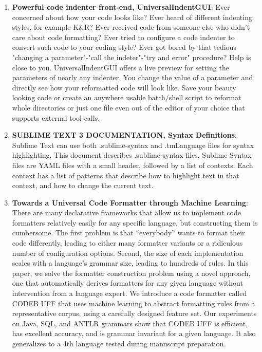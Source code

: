 \begin{englishtext}
\begin{enumerate}
    \item \textbf{Powerful code indenter front-end, UniversalIndentGUI}: Ever concerned
    about how your code looks like? Ever heard of different indenting styles,
    for example K\&R? Ever received code from someone else who didn't care about
    code formatting? Ever tried to configure a code indenter to convert such
    code to your coding style? Ever got bored by that tedious "changing a
    parameter"-"call the indeter"-"try and error" procedure? Help is close to
    you. UniversalIndentGUI offers a live preview for setting the parameters of
    nearly any indenter. You change the value of a parameter and directly see
    how your reformatted code will look like. Save your beauty looking code or
    create an anywhere usable batch/shell script to reformat whole directories
    or just one file even out of the editor of your choice that supports
    external tool calls.

    \item \textbf{SUBLIME TEXT 3 DOCUMENTATION, Syntax Definitions}: Sublime Text can
    use both .sublime-syntax and .tmLanguage files for syntax highlighting. This
    document describes .sublime-syntax files. Sublime Syntax files are YAML
    files with a small header, followed by a list of contexts. Each context has
    a list of patterns that describe how to highlight text in that context, and
    how to change the current text. \cite{Skinner}

    \item \textbf{Towards a Universal Code Formatter through Machine Learning}: There
    are many declarative frameworks that allow us to implement code formatters
    relatively easily for any specific language, but constructing them is
    cumbersome. The first problem is that “everybody” wants to format their code
    differently, leading to either many formatter variants or a ridiculous
    number of configuration options. Second, the size of each implementation
    scales with a language’s grammar size, leading to hundreds of rules. In this
    paper, we solve the formatter construction problem using a novel approach,
    one that automatically derives formatters for any given language without
    intervention from a language expert. We introduce a code formatter called
    CODEB UFF that uses machine learning to abstract formatting rules from a
    representative corpus, using a carefully designed feature set. Our
    experiments on Java, SQL, and ANTLR grammars show that CODEB UFF is
    efficient, has excellent accuracy, and is grammar invariant for a given
    language. It also generalizes to a 4th language tested during manuscript
    preparation. \cite{universalCodeFormatter}


\end{enumerate}
\end{englishtext}
